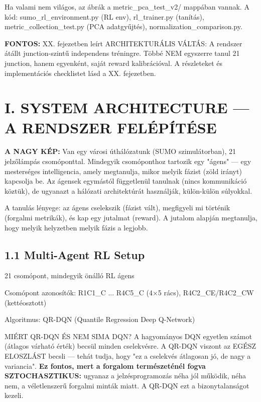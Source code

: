 \documentclass[11pt,a4paper]{article}
\begin{document}
Ha valami nem világos, az ábrák a metric\_pca\_test\_v2/ mappában vannak.
A kód: sumo\_rl\_environment.py (RL env), rl\_trainer.py (tanítás),
metric\_collection\_test.py (PCA adatgyűjtés), normalization\_comparison.py.

\textbf{FONTOS:} XX. fejezetben leírt ARCHITEKTURÁLIS VÁLTÁS:
A rendszer átállt junction-szintű independens tréningre.
Többé NEM egyszerre tanul 21 junction, hanem egyenként, saját
reward kalibrációval. A részleteket és implementációs checklistet
lásd a XX. fejezetben.


\section*{I. SYSTEM ARCHITECTURE — A RENDSZER FELÉPÍTÉSE}

\textbf{A NAGY KÉP:}
Van egy városi úthálózatunk (SUMO szimulátorban), 21 jelzőlámpás
csomóponttal. Mindegyik csomóponthoz tartozik egy "ágens" — egy
mesterséges intelligencia, amely megtanulja, mikor melyik fázist
(zöld irányt) kapcsolja be. Az ágensek egymástól függetlenül tanulnak
(nincs kommunikáció köztük), de ugyanazt a hálózati architektúrát
használják, külön-külön súlyokkal.

A tanulás lényege: az ágens cselekszik (fázist vált), megfigyeli mi
történik (forgalmi metrikák), és kap egy jutalmat (reward). A jutalom
alapján megtanulja, hogy melyik helyzetben melyik fázis a legjobb.

\subsection*{1.1 Multi-Agent RL Setup}
\par\noindent\hspace*{1em}\textbullet{} 21 csomópont, mindegyik önálló RL ágens
\par\noindent\hspace*{1em}\textbullet{} Csomópont azonosítók: R1C1\_C ... R4C5\_C (4×5 rács), R4C2\_CE/R4C2\_CW (kettéosztott)
\par\noindent\hspace*{1em}\textbullet{} Algoritmus: QR-DQN (Quantile Regression Deep Q-Network)

MIÉRT QR-DQN ÉS NEM SIMA DQN?
A hagyományos DQN egyetlen számot (átlagos várható érték) becsül
minden cselekvésre. A QR-DQN viszont az EGÉSZ ELOSZLÁST becsli
— tehát tudja, hogy "ez a cselekvés átlagosan jó, de nagy a variancia".
\textbf{Ez fontos, mert a forgalom természeténél fogva SZTOCHASZTIKUS:}
ugyanaz a jelzésprogramozás néha jól működik, néha nem, a véletlenszerű
forgalmi minták miatt. A QR-DQN ezt a bizonytalanságot kezeli.
\end{document}
